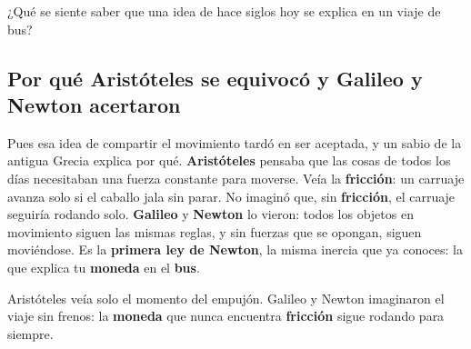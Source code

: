 \documentclass[
  spanish,
  letterpaper,
  12pt,
  oneside,
  open=any,
  DIV=15]{scrbook}
\begin{document}
\begin{tcolorbox}[enhanced jigsaw, arc=.35mm, bottomrule=.15mm, bottomtitle=1mm, breakable, colback=white, colbacktitle=quarto-callout-note-color!10!white, colframe=quarto-callout-note-color-frame, coltitle=black, left=2mm, leftrule=.75mm, opacityback=0, opacitybacktitle=0.6, rightrule=.15mm, title=\textcolor{quarto-callout-note-color}{\faInfo}\hspace{0.5em}{Pregunta socioemocional}, titlerule=0mm, toprule=.15mm, toptitle=1mm]

¿Qué se siente saber que una idea de hace siglos hoy se explica en un
viaje de bus?

\end{tcolorbox}

\subsection{Por qué Aristóteles se equivocó y Galileo y Newton
acertaron}\label{por-quuxe9-aristuxf3teles-se-equivocuxf3-y-galileo-y-newton-acertaron}

Pues esa idea de compartir el movimiento tardó en ser aceptada, y un
sabio de la antigua Grecia explica por qué. \textbf{Aristóteles} pensaba
que las cosas de todos los días necesitaban una fuerza constante para
moverse. Veía la \textcolor[HTML]{DC2626}{\textbf{fricción}}: un
carruaje avanza solo si el caballo jala sin parar. No imaginó que, sin
\textcolor[HTML]{DC2626}{\textbf{fricción}}, el carruaje seguiría
rodando solo. \textbf{Galileo} y \textbf{Newton} lo vieron: todos los
objetos en movimiento siguen las mismas reglas, y sin fuerzas que se
opongan, siguen moviéndose. Es la \textbf{primera ley de Newton}, la
misma inercia que ya conoces: la que explica tu
\textcolor[HTML]{2563EB}{\textbf{moneda}} en el
\textcolor[HTML]{7C3AED}{\textbf{bus}}.

\begin{tcolorbox}[enhanced jigsaw, arc=.35mm, bottomrule=.15mm, bottomtitle=1mm, breakable, colback=white, colbacktitle=quarto-callout-note-color!10!white, colframe=quarto-callout-note-color-frame, coltitle=black, left=2mm, leftrule=.75mm, opacityback=0, opacitybacktitle=0.6, rightrule=.15mm, title=\textcolor{quarto-callout-note-color}{\faInfo}\hspace{0.5em}{Apoyo Visual}, titlerule=0mm, toprule=.15mm, toptitle=1mm]

Aristóteles veía solo el momento del empujón. Galileo y Newton
imaginaron el viaje sin frenos: la \textbf{moneda} que nunca encuentra
\textbf{fricción} sigue rodando para siempre.

\end{tcolorbox}
\end{document}

